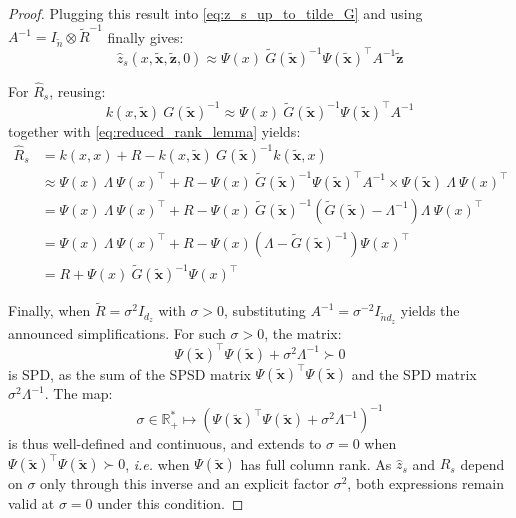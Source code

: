 \begin{proof}
	Plugging this result into \eqref{eq:z_s_up_to_tilde_G} and using $A^{-1}=I_{\tilde{n}}\otimes\tilde{R}^{-1}$ finally gives:
	\begin{equation}
		\hat{z}_s(x,\tilde{\mathbf{x}},\tilde{\mathbf{z}},0)\approx\Psi(x)\:\tilde{G}(\tilde{\mathbf{x}})^{-1}\Psi(\tilde{\mathbf{x}})^\top A^{-1}\tilde{\mathbf{z}}
	\end{equation}

	For $\hat{R}_s$, reusing:
	\begin{equation}
		k(x,\tilde{\mathbf{x}})\:G(\tilde{\mathbf{x}})^{-1}\approx\Psi(x)\:\tilde{G}(\tilde{\mathbf{x}})^{-1}\Psi(\tilde{\mathbf{x}})^\top A^{-1}
	\end{equation}
	together with \eqref{eq:reduced_rank_lemma} yields:
	\begin{equation}
		\begin{aligned}
		\hat{R}_s&=k(x,x)+R-k(x,\tilde{\mathbf{x}})\:G(\tilde{\mathbf{x}})^{-1}k(\tilde{\mathbf{x}},x)\\
		&\approx\Psi(x)\:\Lambda\:\Psi(x)^\top+R-\Psi(x)\:\tilde{G}(\tilde{\mathbf{x}})^{-1}\Psi(\tilde{\mathbf{x}})^\top A^{-1}\times\Psi(\tilde{\mathbf{x}})\:\Lambda\:\Psi(x)^\top\\
		&=\Psi(x)\:\Lambda\:\Psi(x)^\top+R-\Psi(x)\:\tilde{G}(\tilde{\mathbf{x}})^{-1}\left(\tilde{G}(\tilde{\mathbf{x}})-\Lambda^{-1}\right)\Lambda\:\Psi(x)^\top\\
		&=\Psi(x)\:\Lambda\:\Psi(x)^\top+R-\Psi(x)\left(\Lambda-\tilde{G}(\tilde{\mathbf{x}})^{-1}\right)\Psi(x)^\top\\
		&=R+\Psi(x)\:\tilde{G}(\tilde{\mathbf{x}})^{-1}\Psi(x)^\top
		\end{aligned}
	\end{equation}

	Finally, when $\tilde{R}=\sigma^2I_{d_z}$ with $\sigma>0$, substituting $A^{-1}=\sigma^{-2}I_{\tilde{n}d_z}$ yields the announced simplifications. For such $\sigma>0$, the matrix:
	\begin{equation}
		\Psi(\tilde{\mathbf{x}})^\top\Psi(\tilde{\mathbf{x}})+\sigma^2\Lambda^{-1}\succ0
	\end{equation}
	is SPD, as the sum of the SPSD matrix $\Psi(\tilde{\mathbf{x}})^\top\Psi(\tilde{\mathbf{x}})$ and the SPD matrix $\sigma^2\Lambda^{-1}$. The map:
	\begin{equation}
		\sigma\in\mathbb{R}_+^*\mapsto\left(\Psi(\tilde{\mathbf{x}})^\top\Psi(\tilde{\mathbf{x}})+\sigma^2\Lambda^{-1}\right)^{-1}
	\end{equation}
	is thus well-defined and continuous, and extends to $\sigma=0$ when $\Psi(\tilde{\mathbf{x}})^\top\Psi(\tilde{\mathbf{x}})\succ0$, \textit{i.e.} when $\Psi(\tilde{\mathbf{x}})$ has full column rank. As $\hat{z}_s$ and $\hat{R}_s$ depend on $\sigma$ only through this inverse and an explicit factor $\sigma^2$, both expressions remain valid at $\sigma=0$ under this condition.
\end{proof}

